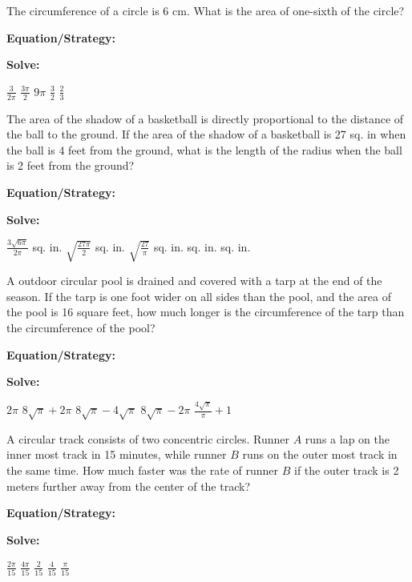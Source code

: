 \vfill
\newpage
\begin{multicols*}{2}
\begin{outline}[enumerate]
\medium

\1 The circumference of a circle is 6 cm. What is the area of one-sixth of the circle?

\bigskip
\textbf{Equation/Strategy:} \hrulefill

\bigskip
\textbf{Solve:}

\vfill
\2 $\frac{3}{2\pi}$
\2 $\frac{3\pi}{2}$
\2 $9\pi$
\2 $\frac{3}{2}$
\2 $\frac{2}{3}$

\midline

\1 The area of the shadow of a basketball is directly proportional to the distance of the ball to the ground. If the area of the shadow of a basketball is 27 sq. in when the ball is 4 feet from the ground, what is the length of the radius when the ball is 2 feet from the ground?

\bigskip
\textbf{Equation/Strategy:} \hrulefill

\bigskip
\textbf{Solve:}

\vfill
\2 $\frac{3\sqrt{6\pi}}{2\pi}$ sq. in.
\2 $\sqrt{\frac{27\pi}{2}}$ sq. in.
\2 $\sqrt{\frac{27}{\pi}}$ sq. in.
 sq. in.
 sq. in.

\columnbreak
\advanced

\1 A outdoor circular pool is drained and covered with a tarp at the end of the season. If the tarp is one foot wider on all sides than the pool, and the area of the pool is 16 square feet, how much longer is the circumference of the tarp than the circumference of the pool?

\bigskip
\textbf{Equation/Strategy:} \hrulefill

\bigskip
\textbf{Solve:}

\vfill
\2 $2\pi$
\2 $8\sqrt\pi+2\pi$
\2 $8\sqrt\pi-4\sqrt\pi$
\2 $8\sqrt\pi-2\pi$
\2 $\frac{4\sqrt\pi}{\pi}+1$

\midline

\1 A circular track consists of two concentric circles. Runner $A$ runs a lap on the inner most track in 15 minutes, while runner $B$ runs on the outer most track in the same time. How much faster was the rate of runner $B$ if the outer track is 2 meters further away from the center of the track?

\bigskip
\textbf{Equation/Strategy:}

\bigskip
\textbf{Solve:}

\vfill
\2 $\frac{2\pi}{15}$
\2 $\frac{4\pi}{15}$
\2 $\frac{2}{15}$
\2 $\frac{4}{15}$
\2 $\frac{\pi}{15}$
\end{outline}
\end{multicols*}